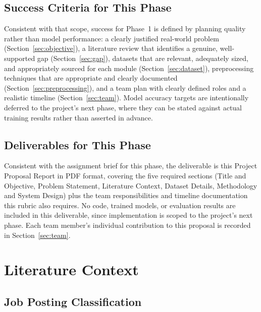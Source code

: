 \documentclass[11pt,a4paper]{article}
\begin{document}
\subsection*{Success Criteria for This Phase}
Consistent with that scope, success for Phase~1 is defined by planning quality rather
than model performance: a clearly justified real-world problem (Section~\ref{sec:objective}),
a literature review that identifies a genuine, well-supported gap
(Section~\ref{sec:gap}), datasets that are relevant, adequately sized, and appropriately
sourced for each module (Section~\ref{sec:dataset}), preprocessing techniques that are
appropriate and clearly documented (Section~\ref{sec:preprocessing}), and a team plan
with clearly defined roles and a realistic timeline (Section~\ref{sec:team}). Model
accuracy targets are intentionally deferred to the project's next phase, where they can
be stated against actual training results rather than asserted in advance.

\subsection*{Deliverables for This Phase}
\label{sec:deliverables}
Consistent with the assignment brief for this phase, the deliverable is this Project
Proposal Report in PDF format, covering the five required sections (Title and
Objective, Problem Statement, Literature Context, Dataset Details, Methodology and
System Design) plus the team responsibilities and timeline documentation this rubric
also requires. No code, trained models, or evaluation results are included in this
deliverable, since implementation is scoped to the project's next phase. Each team
member's individual contribution to this proposal is recorded in
Section~\ref{sec:team}.

\section{Literature Context}
\label{sec:literature}

\subsection{Job Posting Classification}
\label{sec:lit-classification}
\end{document}
